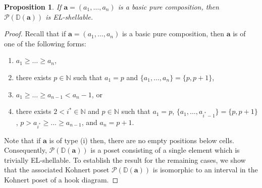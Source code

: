 \documentclass[letterpaper,10pt]{article}
\newtheorem{prop}[theorem]{Proposition}
\begin{document}
\begin{prop}\label{prop:purecomppieces}
    If $\mathbf{a}=(a_1,\hdots,a_n)$ is a basic pure composition, then $\mathcal{P}(\mathbb{D}(\mathbf{a}))$ is EL-shellable.
\end{prop}
\begin{proof}
    Recall that if $\mathbf{a}=(a_1,\hdots,a_n)$ is a basic pure composition, then $\mathbf{a}$ is of one of the following forms:
    \begin{enumerate}
        \item[\textup{(i)}] $a_1\ge \hdots\ge a_n$,
        \item[\textup{(ii)}] there exists $p\in\mathbb{N}$ such that $a_1=p$ and $\{a_1,\hdots,a_n\}=\{p,p+1\}$,
        \item[\textup{(iii)}] $a_1\ge\hdots\ge a_{n-1}<a_n-1$, or
        \item[\textup{(iv)}] there exists $2<i^*\in\mathbb{N}$ and $p\in\mathbb{N}$ such that $a_1=p$, $\{a_1,\hdots,a_{i^*-1}\}=\{p,p+1\}$, $p>a_{i^*}\ge \hdots\ge a_{n-1}$, and $a_{n}=p+1$.
    \end{enumerate}
    Note that if $\mathbf{a}$ is of type (i) then, there are no empty positions below cells. Consequently, $\mathcal{P}(\mathbb{D}(\mathbf{a}))$ is a poset consisting of a single element which is trivially EL-shellable. To establish the result for the remaining cases, we show that the associated Kohnert poset $\mathcal{P}(\mathbb{D}(\mathbf{a}))$ is isomorphic to an interval in the Kohnert poset of a hook diagram. 
    

\end{proof}
\end{document}
